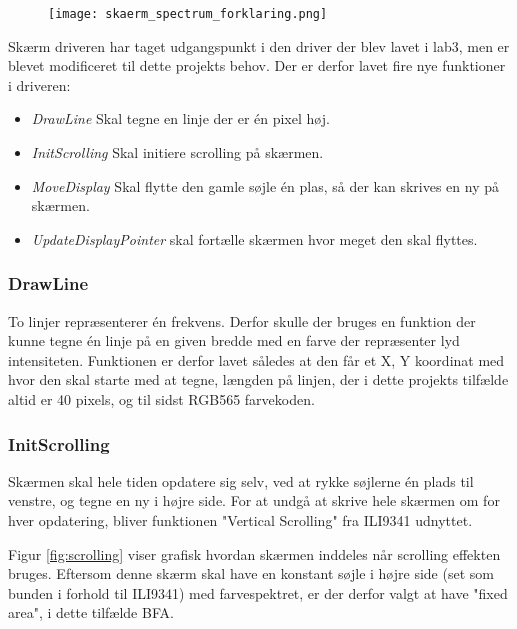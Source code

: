 \begin{figure} [H]
	\centering
	\texttt{[image: skaerm\_spectrum\_forklaring.png]}
	\label{fig:skaerm_spectrum_forklaring}
\end{figure}

Skærm driveren har taget udgangspunkt i den driver der blev lavet i lab3, men er blevet modificeret til dette projekts behov. 
Der er derfor lavet fire nye funktioner i driveren:
\begin{itemize}
	\item \textit{DrawLine} Skal tegne en linje der er én pixel høj.
	\item \textit{InitScrolling} Skal initiere scrolling på skærmen.
	\item \textit{MoveDisplay} Skal flytte den gamle søjle én plas, så der kan skrives en ny på skærmen.
	\item \textit{UpdateDisplayPointer} skal fortælle skærmen hvor meget den skal flyttes.
\end{itemize}

\subsubsection{DrawLine}
To linjer repræsenterer én frekvens. Derfor skulle der bruges en funktion der kunne tegne én linje på en given bredde med en farve der repræsenter lyd intensiteten.
Funktionen er derfor lavet således at den får et X, Y koordinat med hvor den skal starte med at tegne, længden på linjen, der i dette projekts tilfælde altid er 40 pixels, og til sidst RGB565 farvekoden.

\subsubsection{InitScrolling}
Skærmen skal hele tiden opdatere sig selv, ved at rykke søjlerne én plads til venstre, og tegne en ny i højre side. For at undgå at skrive hele skærmen om for hver opdatering, bliver funktionen "Vertical Scrolling" fra ILI9341 udnyttet.

Figur \ref{fig:scrolling} viser grafisk hvordan skærmen inddeles når scrolling effekten bruges. Eftersom denne skærm skal have en konstant søjle i højre side (set som bunden i forhold til ILI9341) med farvespektret, er der derfor valgt at have "fixed area", i dette tilfælde BFA.

